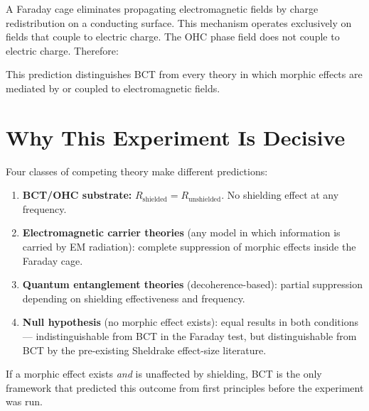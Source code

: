 \documentclass[aps,prl,twocolumn,superscriptaddress,floatfix]{revtex4-2}
\begin{document}
A Faraday cage eliminates propagating electromagnetic fields by
charge redistribution on a conducting surface. This mechanism operates
exclusively on fields that couple to electric charge. The OHC phase
field does not couple to electric charge. Therefore:

\noindent{}

This prediction distinguishes BCT from every theory in which morphic
effects are mediated by or coupled to electromagnetic fields.

\section{Why This Experiment Is Decisive}

Four classes of competing theory make different predictions:

\begin{enumerate}
\item \textbf{BCT/OHC substrate:} $R_\mathrm{shielded}
= R_\mathrm{unshielded}$. No shielding effect at any frequency.

\item \textbf{Electromagnetic carrier theories}
(any model in which information is carried by EM radiation): complete
suppression of morphic effects inside the Faraday cage.

\item \textbf{Quantum entanglement theories}
(decoherence-based): partial suppression depending on shielding
effectiveness and frequency.

\item \textbf{Null hypothesis}
(no morphic effect exists): equal results in both conditions ---
indistinguishable from BCT in the Faraday test, but distinguishable
from BCT by the pre-existing Sheldrake effect-size literature.
\end{enumerate}

If a morphic effect exists \emph{and} is unaffected by shielding, BCT
is the only framework that predicted this outcome from first principles
before the experiment was run.
\end{document}
